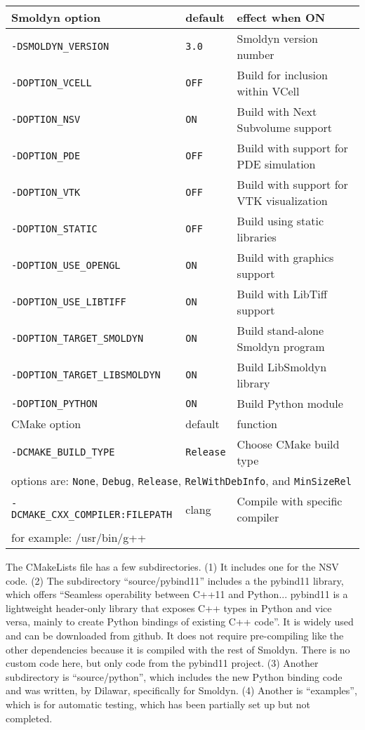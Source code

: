 \documentclass {book}
\begin{document}
\begin{longtable}[c]{lll}
Smoldyn option & default & effect when ON\\
\hline
\texttt{-DSMOLDYN\_VERSION} & \texttt{3.0} & Smoldyn version number\\
\texttt{-DOPTION\_VCELL} & \texttt{OFF} & Build for inclusion within VCell\\
\texttt{-DOPTION\_NSV} & \texttt{ON} & Build with Next Subvolume support\\
\texttt{-DOPTION\_PDE} & \texttt{OFF} & Build with support for PDE simulation\\
\texttt{-DOPTION\_VTK} & \texttt{OFF} & Build with support for VTK visualization\\
\texttt{-DOPTION\_STATIC} & \texttt{OFF} & Build using static libraries\\
\texttt{-DOPTION\_USE\_OPENGL} & \texttt{ON} & Build with graphics support\\
\texttt{-DOPTION\_USE\_LIBTIFF} & \texttt{ON} & Build with LibTiff support\\
\texttt{-DOPTION\_TARGET\_SMOLDYN} & \texttt{ON} & Build stand-alone Smoldyn program\\
\texttt{-DOPTION\_TARGET\_LIBSMOLDYN} & \texttt{ON} & Build LibSmoldyn library\\
\texttt{-DOPTION\_PYTHON} & \texttt{ON} & Build Python module\\
\hline
CMake option & default & function\\
\hline
\texttt{-DCMAKE\_BUILD\_TYPE} & \texttt{Release} & Choose CMake build type\\
\multicolumn{3}{l}{\hspace{0.3in}options are: \texttt{None}, \texttt{Debug}, \texttt{Release}, \texttt{RelWithDebInfo}, and \texttt{MinSizeRel}}\\
\texttt{-DCMAKE\_CXX\_COMPILER:FILEPATH} & clang & Compile with specific compiler\\
\multicolumn{3}{l}{\hspace{0.3in}for example: /usr/bin/g++}\\
\end{longtable}

The CMakeLists file has a few subdirectories. (1) It includes one for the NSV code. (2) The subdirectory ``source/pybind11'' includes a the pybind11 library, which offers ``Seamless operability between C++11 and Python... pybind11 is a lightweight header-only library that exposes C++ types in Python and vice versa, mainly to create Python bindings of existing C++ code''. It is widely used and can be downloaded from github. It does not require pre-compiling like the other dependencies because it is compiled with the rest of Smoldyn. There is no custom code here, but only code from the pybind11 project. (3) Another subdirectory is ``source/python'', which includes the new Python binding code and was written, by Dilawar, specifically for Smoldyn. (4) Another is ``examples'', which is for automatic testing, which has been partially set up but not completed.
\end{document}
